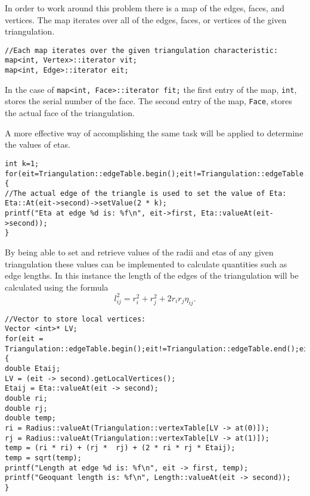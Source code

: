 \documentclass{amsart}
\theoremstyle{plain}
\numberwithin{equation}{section}
\begin{document}
\noindent In order to work around this problem there is a map of the edges, faces, and vertices. The map iterates over all of the edges, faces, or vertices of the given triangulation. \newline

\begin{verbatim}
//Each map iterates over the given triangulation characteristic:
map<int, Vertex>::iterator vit;
map<int, Edge>::iterator eit;

\end{verbatim} 

\noindent In the case of \verb=map<int, Face>::iterator fit;= the first entry of the map, \verb=int=, stores the serial number of the face.  The second entry of the map, \verb=Face=, stores the actual face of the triangulation. \newline

\noindent A more effective way of accomplishing the same task will be applied to determine the values of etas. \newline

\begin{verbatim}             
int k=1;
for(eit=Triangulation::edgeTable.begin();eit!=Triangulation::edgeTable.end();eit++,k++){
//The actual edge of the triangle is used to set the value of Eta:
Eta::At(eit->second)->setValue(2 * k);
printf("Eta at edge %d is: %f\n", eit->first, Eta::valueAt(eit->second));
}

\end{verbatim} 

By being able to set and retrieve values of the radii and etas of any given triangulation these values can be implemented to calculate quantities such as edge lengths.  In this instance the length of the edges of the triangulation will be calculated using the formula \[l_{ij}^2 = r_i^2 + r_j^2 + 2r_i r_j \eta_{ij}.\] \newline

\begin{verbatim}
//Vector to store local vertices:
Vector <int>* LV;
for(eit = Triangulation::edgeTable.begin();eit!=Triangulation::edgeTable.end();eit++){
double Etaij;
LV = (eit -> second).getLocalVertices();
Etaij = Eta::valueAt(eit -> second);
double ri;
double rj;
double temp;
ri = Radius::valueAt(Triangulation::vertexTable[LV -> at(0)]);
rj = Radius::valueAt(Triangulation::vertexTable[LV -> at(1)]);
temp = (ri * ri) + (rj *  rj) + (2 * ri * rj * Etaij);
temp = sqrt(temp);
printf("Length at edge %d is: %f\n", eit -> first, temp);
printf("Geoquant length is: %f\n", Length::valueAt(eit -> second));
}

\end{verbatim}
\end{document}
